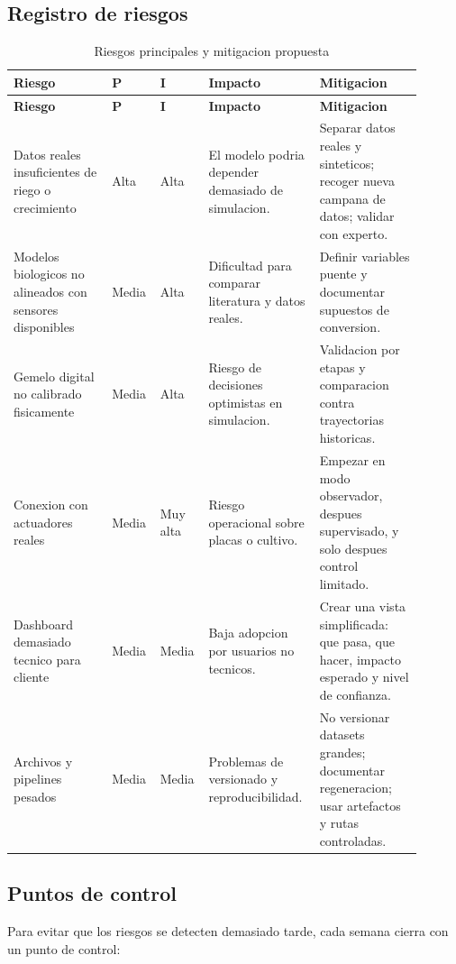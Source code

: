 ﻿\documentclass[11pt,a4paper]{article}
\begin{document}
\subsection{Registro de riesgos}

\begin{longtable}{p{0.23\linewidth}p{0.09\linewidth}p{0.09\linewidth}p{0.25\linewidth}p{0.24\linewidth}}
\caption{Riesgos principales y mitigacion propuesta}\\
\toprule
\textbf{Riesgo} & \textbf{P} & \textbf{I} & \textbf{Impacto} & \textbf{Mitigacion} \\
\midrule
\endfirsthead
\toprule
\textbf{Riesgo} & \textbf{P} & \textbf{I} & \textbf{Impacto} & \textbf{Mitigacion} \\
\midrule
\endhead
Datos reales insuficientes de riego o crecimiento & Alta & Alta & El modelo podria depender demasiado de simulacion. & Separar datos reales y sinteticos; recoger nueva campana de datos; validar con experto. \\ \addlinespace
Modelos biologicos no alineados con sensores disponibles & Media & Alta & Dificultad para comparar literatura y datos reales. & Definir variables puente y documentar supuestos de conversion. \\ \addlinespace
Gemelo digital no calibrado fisicamente & Media & Alta & Riesgo de decisiones optimistas en simulacion. & Validacion por etapas y comparacion contra trayectorias historicas. \\ \addlinespace
Conexion con actuadores reales & Media & Muy alta & Riesgo operacional sobre placas o cultivo. & Empezar en modo observador, despues supervisado, y solo despues control limitado. \\ \addlinespace
Dashboard demasiado tecnico para cliente & Media & Media & Baja adopcion por usuarios no tecnicos. & Crear una vista simplificada: que pasa, que hacer, impacto esperado y nivel de confianza. \\ \addlinespace
Archivos y pipelines pesados & Media & Media & Problemas de versionado y reproducibilidad. & No versionar datasets grandes; documentar regeneracion; usar artefactos y rutas controladas. \\
\bottomrule
\end{longtable}

\subsection{Puntos de control}

Para evitar que los riesgos se detecten demasiado tarde, cada semana cierra con un punto de control:
\end{document}
